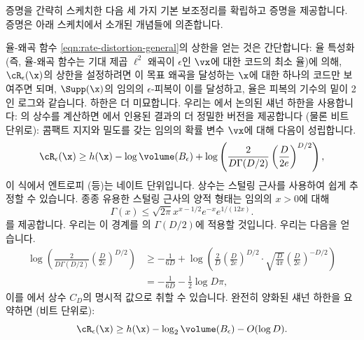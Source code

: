 \documentclass[../../book-main_ko.tex]{subfiles}
\begin{document}
증명을 간략히 스케치한 다음 세 가지 기본 보조정리를 확립하고 증명을 제공합니다. 증명은 아래 스케치에서 소개된 개념들에 의존합니다.

율-왜곡 함수 \eqref{eqn:rate-distortion-general}의 상한을 얻는 것은 간단합니다: 율 특성화 (즉, 율-왜곡 함수는 기대 제곱 \(\ell^2\) 왜곡이 \(\epsilon\)인 \(\vx\)에 대한 코드의 최소 율)에 의해, \(\cR_{\epsilon}(\x)\)의 상한을 설정하려면 이 목표 왜곡을 달성하는 \(\x\)에 대한 하나의 코드만 보여주면 되며, \(\Supp(\x)\)의 임의의 \(\epsilon\)-피복이 이를 달성하고, 율은 피복의 기수의 밑이 2인 로그와 같습니다.
하한은 더 미묘합니다. 우리는 에서 논의된 섀넌 하한을 사용합니다: \cite[\S III, (22)]{Linder1994-ej}의 상수를 계산하면 에서 인용된 결과의 더 정밀한 버전을 제공합니다 (물론 비트 단위로): 콤팩트 지지와 밀도를 갖는 임의의 확률 변수 \(\vx\)에 대해 다음이 성립합니다.
\begin{equation}\label{eq:slb-appendix-1}
    \cR_{\epsilon}(\x)
    \geq
    h(\x)
    - \log \volume(B_{\epsilon})
    +
    \log
    \left(
    \frac{
    	2
    }
    {
    	D \Gamma(D/2)
    }
    \left(
    \frac{
    	D
    }
    {
    	2e
    }
    \right)^{D/2}
    \right),
\end{equation}
이 식에서 엔트로피 (등)는 네이트 단위입니다.
상수는 스털링 근사를 사용하여 쉽게 추정할 수 있습니다.
종종 유용한 스털링 근사의 양적 형태는 임의의 \(x > 0\)에 대해 \cite{Jameson2015-hy}
\begin{equation}
    \Gamma(x) \leq \sqrt{2\pi} x^{x - 1/2} e^{-x} e^{1/(12x)}.
\end{equation}
를 제공합니다. 우리는 이 경계를 의 \(\Gamma(D/2)\)에 적용할 것입니다.
우리는 다음을 얻습니다.
\begin{align}
    \log
    \left(
    \frac{
        2
    }
    {
        D \Gamma(D/2)
    }
    \left(
    \frac{
        D
    }
    {
        2e
    }
    \right)^{D/2}
    \right)
    &\geq
    -\frac{1}{6D}
    +
    \log\left(
        \frac{2}{D}
        \left(
        \frac{
            D
        }
        {
            2e
        }
        \right)^{D/2}
        \cdot
        \sqrt{\frac{D}{4\pi}}
        \left(
        \frac{D}{2e}
        \right)^{-D/2}
    \right)
    \\
    &=
    -\frac{1}{6D}
    - \frac{1}{2}\log D\pi,\label{eq:slb-constant-est}
\end{align}
이를 에서 상수 \(C_D\)의 명시적 값으로 취할 수 있습니다.
완전히 양화된 섀넌 하한을 요약하면 (비트 단위로):
\begin{equation}\label{eq:slb-appendix}
    \cR_{\epsilon}(\x)
    \geq
    h(\x)
    - \log_2 \volume(B_{\epsilon})
    - O(\log D).
\end{equation}
\end{document}
